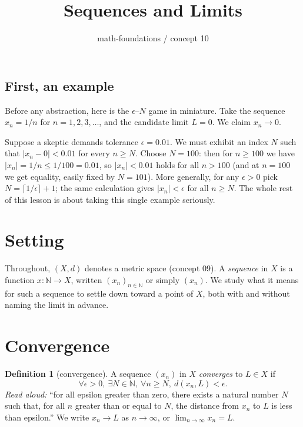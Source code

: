 \documentclass[11pt]{article}
\title{Sequences and Limits}
\author{math-foundations / concept 10}
\date{}
\theoremstyle{definition}
\newtheorem{definition}[theorem]{Definition}
\theoremstyle{remark}
\begin{document}
\maketitle

\subsection*{First, an example}

Before any abstraction, here is the $\epsilon$--$N$ game in
miniature. Take the sequence $x_n = 1/n$ for $n = 1, 2, 3,
\ldots$, and the candidate limit $L = 0$. We claim
$x_n \to 0$.

Suppose a skeptic demands tolerance $\epsilon = 0.01$. We must
exhibit an index $N$ such that $|x_n - 0| < 0.01$ for every
$n \ge N$. Choose $N = 100$: then for $n \ge 100$ we have
$|x_n| = 1/n \le 1/100 = 0.01$, so $|x_n| < 0.01$ holds for all
$n > 100$ (and at $n = 100$ we get equality, easily fixed by
$N = 101$). More generally, for any $\epsilon > 0$ pick
$N = \lceil 1/\epsilon \rceil + 1$; the same calculation gives
$|x_n| < \epsilon$ for all $n \ge N$. The whole rest of this
lesson is about taking this single example seriously.

\section{Setting}

Throughout, $(X, d)$ denotes a metric space (concept 09). A
\emph{sequence} in $X$ is a function $x : \mathbb{N} \to X$,
written $(x_n)_{n \in \mathbb{N}}$ or simply $(x_n)$. We
study what it means for such a sequence to settle down toward
a point of $X$, both with and without naming the limit in
advance.

\section{Convergence}

\begin{definition}[convergence]
A sequence $(x_n)$ in $X$ \emph{converges} to $L \in X$ if
\[
\forall \epsilon > 0,\ \exists N \in \mathbb{N},\
\forall n \ge N,\ d(x_n, L) < \epsilon.
\]
\emph{Read aloud:} ``for all epsilon greater than zero, there
exists a natural number $N$ such that, for all $n$ greater than
or equal to $N$, the distance from $x_n$ to $L$ is less than
epsilon.''
We write $x_n \to L$ as $n \to \infty$, or
$\lim_{n \to \infty} x_n = L$.
\end{definition}
\end{document}
